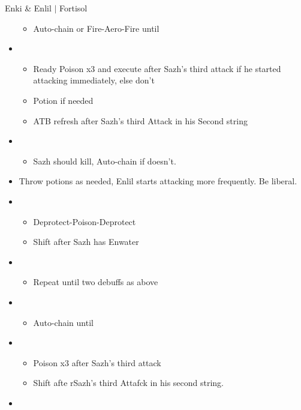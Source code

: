 \begin{battle}[1:41 $|$ 1:30]{Enki \& Enlil $|$ Fortisol}
\begin{multicols}{2}
\begin{itemize}
\begin{itemize}
              \item Auto-chain or Fire-Aero-Fire until \stagger
            \end{itemize}
      \item \sixth
            \begin{itemize}
              \item Ready Poison x3 and execute after Sazh's third attack if he started attacking immediately, else don't
              \item Potion if needed
              \item ATB refresh after Sazh's third Attack in his Second string
            \end{itemize}
      \item \first
            \begin{itemize}
              \item Sazh should kill, Auto-chain if doesn't.
            \end{itemize}
      \item Throw potions as needed, Enlil starts attacking more frequently. Be liberal.
      \item \third
            \begin{itemize}
              \item Deprotect-Poison-Deprotect
              \item Shift after Sazh has Enwater
            \end{itemize}
      \item \fifth
            \begin{itemize}
              \item Repeat until two debuffs as above
            \end{itemize}
      \item \fourth
            \begin{itemize}
              \item Auto-chain until \stagger
            \end{itemize}
      \item \sixth
            \begin{itemize}
              \item Poison x3 after Sazh's third attack
              \item Shift afte rSazh's third Attafck in his second string.
            \end{itemize}
      \item \first
            \begin{itemize}

\end{itemize}
\end{itemize}
\end{multicols}
\end{battle}
